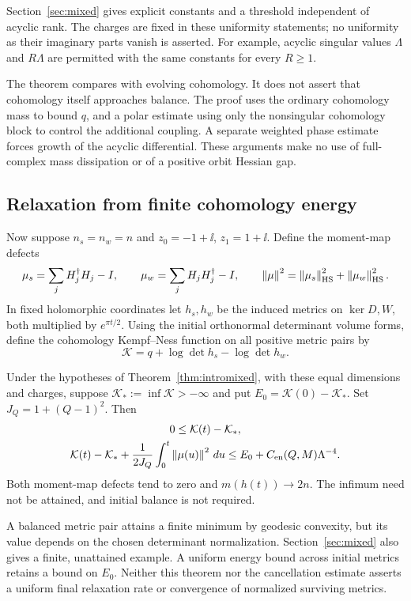 Section~\ref{sec:mixed} gives explicit constants and a threshold
independent of acyclic rank. The charges are fixed in these uniformity
statements; no uniformity as their imaginary parts vanish is asserted.
For example, acyclic singular values $\Lambda$ and $R\Lambda$ are
permitted with the same constants for every $R\geq1$.

The theorem compares with evolving cohomology. It does not assert that
cohomology itself approaches balance. The proof uses the ordinary
cohomology mass to bound $q$, and a polar estimate using only the
nonsingular cohomology block to control the additional coupling.
A separate weighted phase estimate forces growth of the acyclic
differential. These arguments make no use of full-complex mass
dissipation or of a positive orbit Hessian gap.

\subsection{Relaxation from finite cohomology energy}
Now suppose $n_s=n_w=n$ and $z_0=-1+\ii$, $z_1=1+\ii$.
Define the moment-map defects
\[
 \mu_s=\sum_jH_j^\dagger H_j-I,\qquad
 \mu_w=\sum_jH_jH_j^\dagger-I,\qquad
 \left\lVert\mu\right\rVert^2=\left\lVert\mu_s\right\rVert_{\mathrm{HS}}^2+\left\lVert\mu_w\right\rVert_{\mathrm{HS}}^2.
\]
In fixed holomorphic coordinates let $h_s,h_w$ be the induced metrics
on $\ker D,W$, both multiplied by $e^{\pi t/2}$.
Using the initial orthonormal determinant volume forms, define the
cohomology Kempf--Ness function on all positive metric pairs by
\[
 \mathcal K=q+\log\det h_s-\log\det h_w.
\]

\begin{theorem}\label{thm:relaxation}
Under the hypotheses of Theorem~\ref{thm:intromixed}, with these equal
dimensions and charges, suppose
$\mathcal K_*:=\inf\mathcal K> -\infty$ and put
$E_0=\mathcal K(0)-\mathcal K_*$. Set $J_Q=1+(Q-1)^2$.
Then
\begin{equation}\label{eq:intromixedenergy}
 \begin{gathered}
 0\leq\mathcal K(t)-\mathcal K_*,\\
 \mathcal K(t)-\mathcal K_*+
 \frac1{2J_Q}\int_0^t\left\lVert\mu(u)\right\rVert^2\,du
 \leq E_0+C_{\mathrm{en}}(Q,M)\Lambda^{-4}.
 \end{gathered}
\end{equation}
Both moment-map defects tend to zero and $m(h(t))\to2n$.
The infimum need not be attained, and initial balance is not required.
\end{theorem}

A balanced metric pair attains a finite minimum by geodesic convexity,
but its value depends on the chosen determinant normalization.
Section~\ref{sec:mixed} also gives a finite, unattained example.
A uniform energy bound across initial metrics retains a bound on $E_0$.
Neither this theorem nor the cancellation estimate asserts a uniform
final relaxation rate or convergence of normalized surviving metrics.

